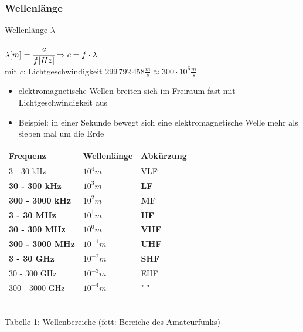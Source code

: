 \begin{frame}
    \frametitle{Wellenlänge}

    \begin{center}
        \begin{block}{Wellenlänge $\lambda$}
            \begin{center}
                {\Huge$ \lambda [m] = \cfrac{c}{f [Hz]} \Rightarrow
                c = f \cdot \lambda $} \\[1em]
                mit $c$: Lichtgeschwindigkeit $299\,792\,458 \frac{m}{s} \approx
                300\cdot10^6\frac{m}{s}$
            \end{center}
        \end{block}

	    \begin{normalsize}		
	        \begin{itemize}
		        \item elektromagnetische Wellen breiten sich im Freiraum fast mit Lichtgeschwindigkeit aus
		        \item Beispiel: in einer Sekunde bewegt sich eine elektromagnetische Welle mehr als sieben mal um die Erde
	        \end{itemize}
	    \end{normalsize}
    \end{center}
\end{frame}

\begin{frame}
	\begin{center}
	    \begin{Large}
	        \begin{tabular}{|l|l|l|}
	        	\hline
                Frequenz & Wellenlänge & Abkürzung\\
	        	\hline \hline
                3 - 30 kHz     & $10^{4}m$    & VLF \\ \hline
                \textbf{30 - 300 kHz}   & \textbf{$10^{3}m$}      & \textbf{LF}  \\ \hline
                \textbf{300 - 3000 kHz} & \textbf{$10^{2}m$}     & \textbf{MF}  \\ \hline
                \textbf{3 - 30 MHz}     & \textbf{$10^{1}m$}      & \textbf{HF}  \\ \hline
                \textbf{30 - 300 MHz}   & \textbf{$10^{0}m$}          & \textbf{VHF} \\ \hline
                \textbf{300 - 3000 MHz} & \textbf{$10^{-1}m$}      & \textbf{UHF} \\ \hline
                \textbf{3 - 30 GHz}     & \textbf{$10^{-2}m$}     & \textbf{SHF} \\ \hline
                30 - 300 GHz   & $10^{-3}m$     & EHF \\ \hline
                300 - 3000 GHz & $10^{-4}m$ & " " \\ \hline
            \end{tabular}\\[1em]
            {\scriptsize Tabelle 1: Wellenbereiche (fett: Bereiche des Amateurfunks)}
        \end{Large}		
	\end{center}
\end{frame}

